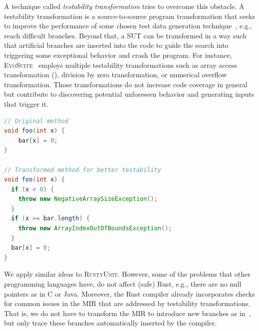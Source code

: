 \documentclass[paper=a4,%
  twoside,%
  BCOR4mm,%
  abstract=true,%
  toc=bibliography,%
  chapterprefix=true,%
  toc=bibliographynumbered,%
  open=right,%
  english,%
  pagesize=pdftex]{scrreprt}
\newcommand{\tech}{\textsc{RustyUnit}\xspace}
\newcommand{\mir}{\ac{MIR}\xspace}
\begin{document}
A technique called \textit{testability transformation} tries to overcome this obstacle. A testability transformation is a source-to-source program transformation that seeks to improve the performance of some chosen test data generation technique~\cite{Harman2004}, e.g., reach difficult branches. Beyond that, a \ac{SUT} can be transformed in a way such that artificial branches are inserted into the code to guide the search into triggering some exceptional behavior and crash the program. For instance, \textsc{EvoSuite}~\cite{Fraser2013} employs multiple testability transformations such as array access transformation (), division by zero transformation, or numerical overflow transformation. Those transformations do not increase code coverage in general but contribute to discovering potential unforeseen behavior and generating inputs that trigger it.

\begin{lstlisting}[language=Java, style=boxed, caption={Array access transformation in \textsc{EvoSuite} for Java}, label=lst:evosuite-array-access-transformation]
// Original method
void foo(int x) {
    bar[x] = 0;
}

// Transformed method for better testability
void foo(int x) {
  if (x < 0) {
    throw new NegativeArraySizeException();
  }
  if (x >= bar.length) {
    throw new ArrayIndexOutOfBoundsException();
  }
  bar[x] = 0;
}
\end{lstlisting}

We apply similar ideas to \tech. However, some of the problems that other programming languages have, do not affect (safe) Rust, e.g., there are no null pointers as in C or Java. Moreover, the Rust compiler already incorporates checks for common issues in the \mir that are addressed by testability transformations. That is, we do not have to transform the \mir to introduce new branches as in~, but only trace these branches automatically inserted by the compiler. 

\end{document}
